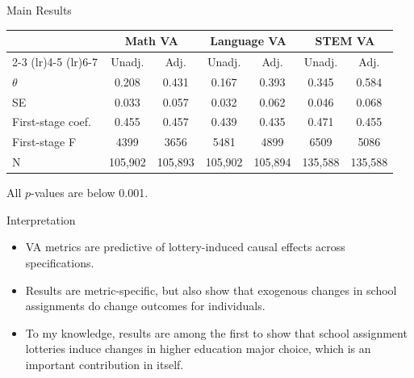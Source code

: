 \documentclass[notes,11pt,aspectratio=169]{beamer}
\newenvironment{wideitemize}{%
  \begin{minipage}{0.90\textwidth}
  \begin{itemize}
  \addtolength{\itemsep}{1em}
}{%
  \end{itemize}
  \end{minipage}
}
\begin{document}
\begin{frame}{Main Results}
\centering
\scriptsize
\begin{tabular}{lcccccc}
\toprule
 & \multicolumn{2}{c}{Math VA} & \multicolumn{2}{c}{Language VA} & \multicolumn{2}{c}{STEM VA} \\
\cmidrule(lr){2-3} \cmidrule(lr){4-5} \cmidrule(lr){6-7}
 & Unadj. & Adj. & Unadj. & Adj. & Unadj. & Adj. \\
\midrule
\(\theta\) & 0.208 & 0.431 & 0.167 & 0.393 & 0.345 & 0.584 \\
SE & 0.033 & 0.057 & 0.032 & 0.062 & 0.046 & 0.068 \\
\midrule
First-stage coef. & 0.455 & 0.457 & 0.439 & 0.435 & 0.471 & 0.455 \\
First-stage F & 4399 & 3656 & 5481 & 4899 & 6509 & 5086 \\
N & 105,902 & 105,893 & 105,902 & 105,894 & 135,588 & 135,588 \\
\bottomrule
\end{tabular}

\vspace{0.7em}
\footnotesize
All \(p\)-values are below 0.001.
\end{frame}



\begin{frame}{Interpretation}
\begin{wideitemize}



\item VA metrics are predictive of lottery-induced causal effects across specifications. 
\item Results are metric-specific, but also show that exogenous changes in school assignments do change outcomes for individuals. 

\item To my knowledge, results are among the first to show that school assignment lotteries induce changes in higher education major choice, which is an important contribution in itself.

\end{wideitemize}
\end{frame}
\end{document}
